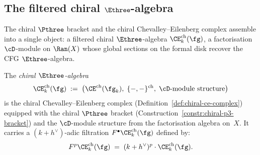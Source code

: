 \subsection{The filtered chiral $\Ethree$-algebra}
\label{subsec:filtered-e3-chiral}

The chiral $\Pthree$ bracket and the chiral
Chevalley--Eilenberg complex assemble into a single object:
a filtered chiral $\Ethree$-algebra
$\CE^{\mathrm{ch}}_k(\fg)$, a factorisation $\cD$-module
on $\Ran(X)$ whose global sections on the formal disk
recover the CFG $\Ethree$-algebra.

\begin{definition}
\label{def:filtered-e3-chiral}
The \emph{chiral $\Ethree$-algebra}
\begin{equation}\label{eq:chiral-e3-algebra}
 \CE^{\mathrm{ch}}_k(\fg)
 \;:=\;
 \bigl(\CE^{\mathrm{ch}}(\fg_k),\;
 \{-,-\}^{\mathrm{ch}},\;
 \cD\textrm{-module structure}\bigr)
\end{equation}
is the chiral Chevalley--Eilenberg complex
(Definition~\ref{def:chiral-ce-complex}) equipped with
the chiral $\Pthree$ bracket
(Construction~\ref{constr:chiral-p3-bracket}) and the
$\cD$-module structure from the factorisation algebra
on~$X$. It carries a $(k+h^\vee)$-adic filtration
$F^\bullet \CE^{\mathrm{ch}}_k(\fg)$ defined by:
\begin{equation}\label{eq:hbar-filtration}
 F^p \CE^{\mathrm{ch}}_k(\fg)
 \;=\;
 (k+h^\vee)^p \cdot \CE^{\mathrm{ch}}_k(\fg).
\end{equation}
\end{definition}

